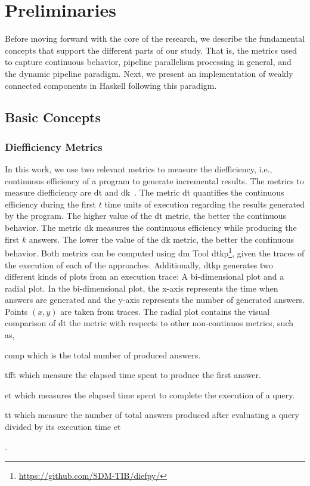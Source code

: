 \section{Preliminaries}\label{prelim}
Before moving forward with the core of the research, we describe the fundamental concepts that support the different parts of our study. That is, the metrics used to capture continuous behavior, pipeline parallelism processing in general, and the dynamic pipeline paradigm. Next, we present an implementation of weakly connected components in Haskell following this paradigm. 
\subsection{Basic Concepts}
%
\subsubsection{Diefficiency Metrics}\label{prem:dief}
In this work, we use two relevant metrics to measure the diefficiency, i.e., continuous efficiency of a program to generate incremental results. The metrics to measure diefficiency are \acrshort{dt} and \acrshort{dk}~\cite{diefpaper}. The metric \acrshort{dt} quantifies the continuous efficiency during the first $t$ time units of execution regarding the results generated by the program. The higher value of the \acrshort{dt} metric, the better the continuous behavior. The metric \acrshort{dk} measures the continuous efficiency while producing the first $k$ answers. The lower the value of the \acrshort{dk} metric, the better the continuous behavior.
Both metrics can be computed using \acrfull{dm} Tool \acrshort{dtkp}\footnote{\url{https://github.com/SDM-TIB/diefpy/}}, given the traces of the execution of each of the approaches.
Additionally, \acrshort{dtkp} generates two different kinds of plots from an execution trace: A bi-dimensional plot  and a radial plot. In the bi-dimensional plot, the x-axis represents the time when answers  are generated and the y-axis represents the number of generated answers. Points  $(x,y)$  are taken from traces.  The radial plot contains the visual comparison of \acrshort{dt} the metric with respects to other non-continuos metrics, such as, 
\begin{inparaenum}[\bf i\upshape)]
  \item \acrfull{comp} which is the total number of  produced answers. 
  \item \acrfull{tfft} which measure the elapsed time spent to produce the first answer. 
  \item \acrfull{et} which measures the elapsed time spent  to complete the execution of a query. 
  \item \acrfull{tt} which measure the number of total answers produced after evaluating a query divided by its execution time \acrshort{et}
\end{inparaenum}.

